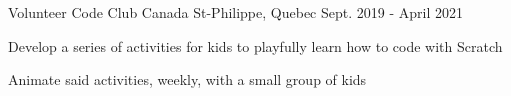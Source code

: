 

\begin{cventries}

  \cventry
    {Volunteer} %
    {Code Club Canada} %
    {St-Philippe, Quebec} %
    {Sept. 2019 - April 2021} %
    {
      \begin{cvitems} %
        \item {Develop a series of activities for kids to playfully learn how to code with Scratch}
        \item {Animate said activities, weekly, with a small group of kids}
      \end{cvitems}
    }

\end{cventries}
